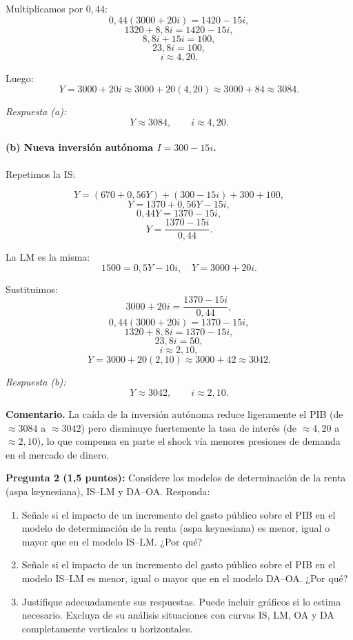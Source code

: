\documentclass[11pt,addpoints]{article}
\begin{document}
Multiplicamos por $0{,}44$:
\[
0{,}44(3000 + 20i) = 1420 - 15i,
\]
\newpage
\vspace*{0.5cm}
\[
1320 + 8{,}8i = 1420 - 15i,
\]
\[
8{,}8i + 15i = 100,
\]
\[
23{,}8i = 100,
\]
\[
i \approx 4{,}20.
\]

Luego:
\[
Y = 3000 + 20i \approx 3000 + 20(4{,}20) \approx 3000 + 84 \approx 3084.
\]

\emph{Respuesta (a):}
\[
\boxed{Y \approx 3084, \qquad i \approx 4{,}20.}
\]

\medskip

\paragraph{(b) Nueva inversión autónoma $I = 300 - 15i$.}

Repetimos la IS:

\[
Y = (670 + 0{,}56Y) + (300 - 15i) + 300 + 100,
\]
\[
Y = 1370 + 0{,}56Y - 15i,
\]
\[
0{,}44Y = 1370 - 15i,
\]
\[
Y = \frac{1370 - 15i}{0{,}44}. \tag{IS'}
\]

La LM es la misma:
\[
1500 = 0{,}5Y - 10i, \quad Y = 3000 + 20i.
\]

Sustituimos:
\[
3000 + 20i = \frac{1370 - 15i}{0{,}44},
\]
\[
0{,}44(3000 + 20i) = 1370 - 15i,
\]
\[
1320 + 8{,}8i = 1370 - 15i,
\]
\[
23{,}8i = 50,
\]
\[
i \approx 2{,}10,
\]
\[
Y = 3000 + 20(2{,}10) \approx 3000 + 42 \approx 3042.
\]

\emph{Respuesta (b):}
\[
\boxed{Y \approx 3042, \qquad i \approx 2{,}10.}
\]

\textbf{Comentario.}  
La caída de la inversión autónoma reduce ligeramente el PIB (de $\approx 3084$ a $\approx 3042$) pero disminuye fuertemente la tasa de interés (de $\approx 4{,}20$ a $\approx 2{,}10$), lo que compensa en parte el shock vía menores presiones de demanda en el mercado de dinero.

\vspace{0.4cm}

\newpage
\vspace*{0.5cm}
\textbf{Pregunta 2 (1{,}5 puntos):}  
Considere los modelos de determinación de la renta (aspa keynesiana), IS--LM y DA--OA. Responda:

\begin{enumerate}[label=\alph*)]
    \item Señale si el impacto de un incremento del gasto público sobre el PIB en el modelo de determinación de la renta (aspa keynesiana) es menor, igual o mayor que en el modelo IS--LM. ¿Por qué?
    \item Señale si el impacto de un incremento del gasto público sobre el PIB en el modelo IS--LM es menor, igual o mayor que en el modelo DA--OA. ¿Por qué?
    \item Justifique adecuadamente sus respuestas. Puede incluir gráficos si lo estima necesario. Excluya de su análisis situaciones con curvas IS, LM, OA y DA completamente verticales u horizontales.
\end{enumerate}
\end{document}
